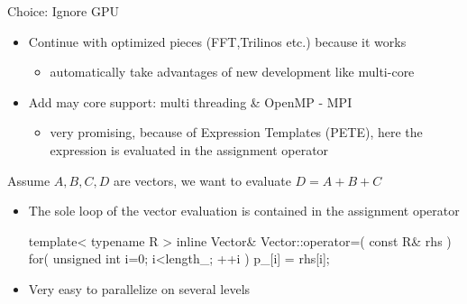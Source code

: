 \documentclass[xcolor=pdftex,table,10pt,yellow,mathserif]{beamer}
\begin{document}
 \begin{frame}[containsverbatim]{Choice: Ignore GPU}
\begin{itemize}
\item Continue with optimized pieces (FFT,Trilinos etc.) because it works
\begin{itemize}
\item automatically take advantages of new development like multi-core
\end{itemize}
\item Add may core support: multi threading \& OpenMP - MPI
\begin{itemize}
\item very promising, because of Expression Templates (PETE), here the expression is evaluated in the  assignment operator
\end{itemize}
\end{itemize}
Assume $A,B,C,D$ are vectors, we want to evaluate $D=A+B+C$
\begin{itemize}
\item The sole loop of the vector evaluation is contained in the assignment operator \begin{smallcode}
   template< typename R > 
   inline Vector& Vector::operator=( const R& rhs ) 
   { 
      for( unsigned int i=0; i<length_; ++i ) 
         p_[i] = rhs[i]; 
   }
\end{smallcode}
\item Very easy to parallelize on several levels
\end{itemize}

\end{frame}


\end{document}
